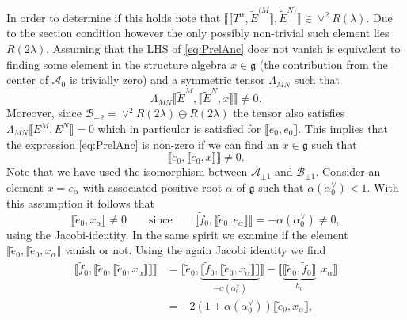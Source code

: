 In order to determine if this holds note that $\llbracket\llbracket T^\alpha ,\tilde{E}^{(M}\rrbracket,\tilde{E}^{N)}\rrbracket\in \vee^2R(\lambda)$. Due to the section condition however the only possibly non-trivial such element lies $R(2\lambda)$. Assuming that the LHS of \eqref{eq:PrelAnc} does not vanish is equivalent to finding some element in the structure algebra $x\in\mathfrak{g}$ (the contribution from the center of $\mathscr{A}_0$ is trivially zero) and a symmetric tensor $\Lambda_{MN}$ such that 
\begin{equation}
    \Lambda_{MN}\llbracket \tilde{E}^M,\llbracket\tilde{E}^N,x\rrbracket\rrbracket \neq 0.
\end{equation}
Moreover, since $\mathscr{B}_{-2}=\vee^2 R(2\lambda)\ominus R(2\lambda)$ the tensor also satisfies $\Lambda_{MN}\llbracket E^{M},E^N\rrbracket=0$ which in particular is satisfied for $\llbracket e_0,e_0\rrbracket$. This implies that the expression \eqref{eq:PrelAnc} is non-zero if we can find an $x\in\mathfrak{g}$ such that
\begin{equation}
    \llbracket \tilde{e}_0,\llbracket\tilde{e}_0,x\rrbracket\rrbracket \neq 0. 
\end{equation}
Note that we have used the isomorphism between $\mathscr{A}_{\pm 1}$ and $\mathscr{B}_{\pm 1}$. Consider an element $x=e_\alpha$ with associated positive root $\alpha$ of $\mathfrak{g}$ such that $\alpha(\alpha_0^\vee)< 1$. With this assumption it follows that 
\begin{equation}
    \llbracket \tilde{e}_0,x_\alpha\rrbracket \neq 0 \qquad \text{since}\qquad \llbracket \tilde{f}_0,\llbracket \tilde{e}_0,e_\alpha\rrbracket\rrbracket = -\alpha(\alpha_0^\vee)\neq 0, 
\end{equation}
using the Jacobi-identity. In the same spirit we examine if the element $\llbracket \tilde{e}_0,\llbracket \tilde{e}_0,x_\alpha\rrbracket$ vanish or not. Using the again Jacobi identity we find
\begin{equation}
    \begin{aligned}
        \llbracket \tilde{f}_0,\llbracket \tilde{e}_0,\llbracket \tilde{e}_0,x_\alpha\rrbracket\rrbracket\rrbracket  &= \llbracket \tilde{e}_0,\underbrace{\llbracket\tilde{f}_0,\llbracket \tilde{e}_0,x_\alpha\rrbracket\rrbracket}_{-\alpha(\alpha_0^\vee)}\rrbracket-\llbracket\underbrace{\llbracket \tilde{e}_0,\tilde{f}_0\rrbracket}_{h_0},x_\alpha\rrbracket\\
        &= -2(1+\alpha(\alpha_0^\vee))\llbracket \tilde{e}_0,x_\alpha\rrbracket,
    \end{aligned}
\end{equation}
